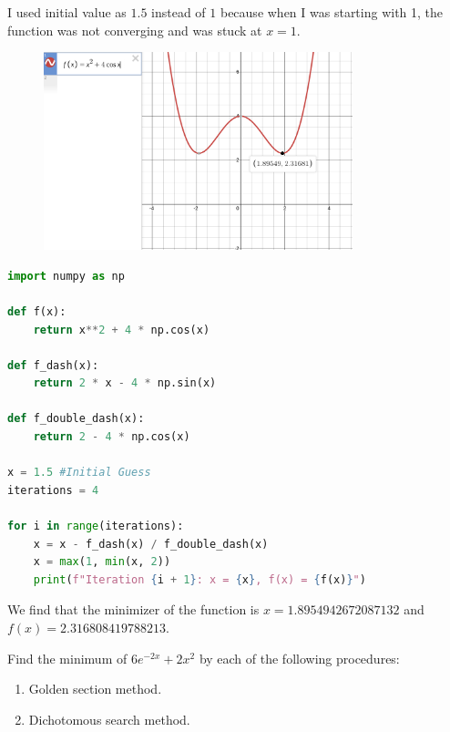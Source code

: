 \documentclass{article}
\begin{document}
\begin{remark*}
I used initial value as $1.5$ instead of $1$ because when I was starting with 1, the function was not converging and was stuck at $x = 1$.
\end{remark*}

\begin{figure}[H]
    \centering
    \includegraphics[width=0.8\textwidth]{Images/Q2.png}
\end{figure}

\begin{lstlisting}[language=Python]
import numpy as np

def f(x):
    return x**2 + 4 * np.cos(x)

def f_dash(x):
    return 2 * x - 4 * np.sin(x)

def f_double_dash(x):
    return 2 - 4 * np.cos(x)

x = 1.5 #Initial Guess
iterations = 4

for i in range(iterations):
    x = x - f_dash(x) / f_double_dash(x)
    x = max(1, min(x, 2))
    print(f"Iteration {i + 1}: x = {x}, f(x) = {f(x)}")
\end{lstlisting}

We find that the minimizer of the function is \(\boxed{x = 1.8954942672087132}\) and \(f(x) = 2.316808419788213\).

\clearpage

\begin{question*}[3]
    Find the minimum of \(6e^{-2x} + 2x^2\) by each of the following procedures:
    \begin{enumerate}[label=\alph*.]
        \item Golden section method.
        \item Dichotomous search method.
    \end{enumerate}
\end{question*}
\end{document}
